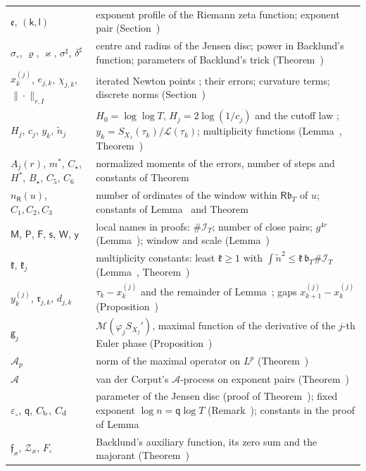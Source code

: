 \documentclass[preprint,12pt]{elsarticle}
\makeatletter
\let\CG@origref\ref
\let\CG@origeqref\eqref
\newcommand{\CG@gettip}[1]{\@ifundefined{CGTip@#1}{Reference: #1}{\csname CGTip@#1\endcsname}}
\DeclareRobustCommand{\CGref}[1]{\pdftooltip{\CG@origref{#1}}{\CG@gettip{#1}}}
\DeclareRobustCommand{\CGeqref}[1]{\pdftooltip{\CG@origeqref{#1}}{\CG@gettip{#1}}}
\numberwithin{equation}{section}
\theoremstyle{plain}
\theoremstyle{definition}
\theoremstyle{remark}
\newcommand{\lL}{\mathcal L}
\newcommand{\IT}{\mathcal I_T}
\makeatother
\begin{document}
\begin{center}
\begin{longtable}{p{}p{}}
$\mathfrak e$, $(\mathsf k,\mathsf l)$ & exponent profile of the Riemann zeta function; exponent pair (Section~\CGref{sec:envelope})\\
$\sigma_\circ$, $\varrho$, $\varkappa$, $\sigma^\sharp$, $\delta^\sharp$ & centre and radius of the Jensen disc; power in Backlund's function; parameters of Backlund's trick (Theorem~\CGref{thm:known_backlund})\\
$x^{(j)}_k$, $e_{j,k}$, $\chi_{j,k}$, $\|\cdot\|_{r,I}$ & iterated Newton points \CGeqref{eq:newton_iteration}; their errors; curvature terms; discrete norms (Section~\CGref{sec:iteration})\\
$H_j$, $c_j$, $y_k$, $\tilde n_j$ & $H_0=\log\log T$, $H_j=2\log(1/c_j)$ and the cutoff law \CGeqref{eq:cutoff_law}; $y_k=S_{X_1}(\tau_k)/\lL(\tau_k)$; multiplicity functions (Lemma~\CGref{lem:multiplicity}, Theorem~\CGref{thm:multiplicity_all})\\
$A_j(r)$, $m^*$, $C_\star$, $H^*$, $B_\star$, $C_5$, $C_6$ & normalized moments of the errors, number of steps and constants of Theorem~\CGref{thm:uniform_iteration}\\
$n_{\mathsf R}(u)$, $C_1,C_2,C_3$ & number of ordinates of the window within $\mathsf R\mathfrak b_T$ of $u$; constants of Lemma~\CGref{lem:zero_pairs} and Theorem~\CGref{thm:multiplicity_all}\\
$\mathsf M$, $\mathsf P$, $\mathsf F$, $\mathsf s$, $\mathsf W$, $\mathsf y$ & local names in proofs: $\#\IT$; number of close pairs; $g^{4r}$ (Lemma~\CGref{lem:sampling_rho}); window and scale (Lemma~\CGref{lem:maximal_primes})\\
$\mathfrak k$, $\mathfrak k_j$ & multiplicity constants: least $\mathfrak k\ge1$ with $\int\tilde n^2\le\mathfrak k\,\mathfrak b_T\#\IT$ (Lemma~\CGref{lem:sampling_rho}, Theorem~\CGref{thm:uniform_iteration})\\
$y^{(j)}_k$, $\mathfrak r_{j,k}$, $d_{j,k}$ & $\tau_k-x^{(j)}_k$ and the remainder of Lemma~\CGref{lem:second_identity}; gaps $x^{(j)}_{k+1}-x^{(j)}_k$ (Proposition~\CGref{prop:deformation})\\
$\mathsf g_j$ & $\mathcal M(\varphi_jS_{X_j}')$, maximal function of the derivative of the $j$-th Euler phase (Proposition~\CGref{prop:recursion})\\
$\mathcal A_p$ & norm of the maximal operator on $L^p$ (Theorem~\CGref{thm:known_maximal})\\
$\mathscr A$ & van der Corput\textquoteright s $\mathscr A$-process on exponent pairs (Theorem~\CGref{thm:known_exponents})\\
$\varepsilon_\circ$, $\mathsf q$, $C_{\rm b}$, $C_{\rm d}$ & parameter of the Jensen disc (proof of Theorem~\CGref{thm:envelope}); fixed exponent $\log n=\mathsf q\log T$ (Remark~\CGref{rem:transport}); constants in the proof of Lemma~\CGref{lem:higher_moments}\\
$\mathfrak f_\varkappa$, $\mathcal Z_\varkappa$, $F_\circ$ & Backlund's auxiliary function, its zero sum and the majorant (Theorem~\CGref{thm:known_backlund})\\
\end{longtable}
\end{center}
\end{document}
